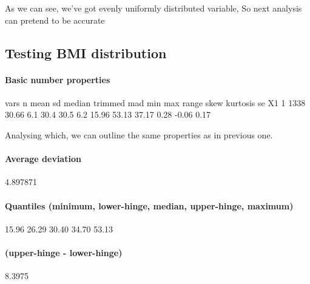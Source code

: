 \documentclass{article}
\begin{document}
As we can see, we've got evenly uniformly distributed variable, 
So next analysis can pretend to be accurate



\subsection{Testing BMI distribution}
\paragraph{Basic number properties \newline} 
\begin{Schunk}
\begin{Soutput}
   vars    n  mean  sd median trimmed mad   min   max range skew kurtosis   se
X1    1 1338 30.66 6.1   30.4    30.5 6.2 15.96 53.13 37.17 0.28    -0.06 0.17
\end{Soutput}
\end{Schunk}
Analysing which, we can outline the same properties as in previous one.
\paragraph{Average deviation \newline} 

\begin{Schunk}
\begin{Soutput}
[1] 4.897871
\end{Soutput}
\end{Schunk}
\paragraph{Quantiles (minimum, lower-hinge, median, upper-hinge, maximum) \newline} 
\begin{Schunk}
\begin{Soutput}
[1] 15.96 26.29 30.40 34.70 53.13
\end{Soutput}
\end{Schunk}

\paragraph{ (upper-hinge - lower-hinge) \newline} 
\begin{Schunk}
\begin{Soutput}
[1] 8.3975
\end{Soutput}
\end{Schunk}
\end{document}
